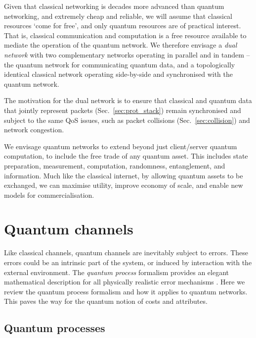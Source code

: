 \documentclass[aps,rmp,twocolumn,amsmath,amssymb,nofootinbib,superscriptaddress,longbibliography,floatfix,table-of-contents,eqsecnum]{revtex4-1}
\begin{document}
Given that classical networking is decades more advanced than quantum networking, and extremely cheap and reliable, we will assume that classical resources `come for free', and only quantum resources are of practical interest. That is, classical communication and computation is a free resource available to mediate the operation of the quantum network. We therefore envisage a \textit{dual network} with two complementary networks operating in parallel and in tandem -- the quantum network for communicating quantum data, and a topologically identical classical network operating side-by-side and synchronised with the quantum network.

The motivation for the dual network is to ensure that classical and quantum data that jointly represent packets (Sec.~\ref{sec:prot_stack}) remain synchronised and subject to the same QoS issues, such as packet collisions (Sec.~\ref{sec:collision}) and network congestion.

We envisage quantum networks to extend beyond just client/server quantum computation, to include the free trade of any quantum asset. This includes state preparation, measurement, computation, randomness, entanglement, and information. Much like the classical internet, by allowing quantum assets to be exchanged, we can maximise utility, improve economy of scale, and enable new models for commercialisation.

%
%

\section{Quantum channels} \label{sec:quant_chan} 

Like classical channels, quantum channels are inevitably subject to errors. These errors could be an intrinsic part of the system, or induced by interaction with the external environment. The \textit{quantum process} formalism provides an elegant mathematical description for all physically realistic error mechanisms \cite{bib:NielsenChuang00, bib:Gilchrist05}. Here we review the quantum process formalism and how it applies to quantum networks. This paves the way for the quantum notion of costs and attributes.

%
%

\subsection{Quantum processes} 
\end{document}
